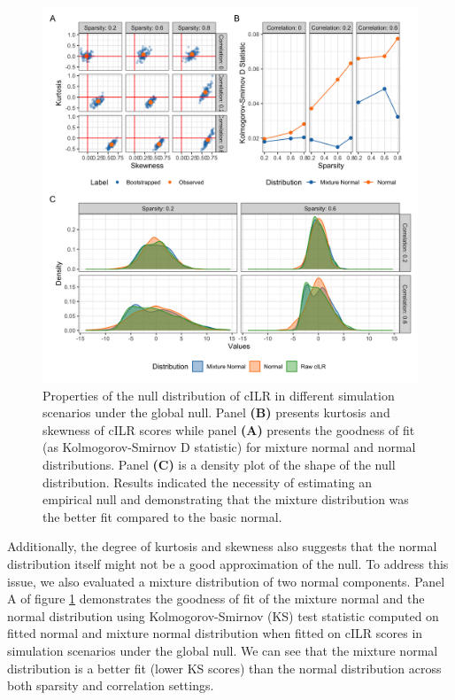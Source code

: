\documentclass{article}
\begin{document}
\begin{figure} [H]
    \centering
    \includegraphics[width=\linewidth]{figures/kurtosis_skewness_gof.png}
    \caption{Properties of the null distribution of cILR in different simulation scenarios under the global null. Panel \textbf{(B)} presents kurtosis and skewness of cILR scores while panel \textbf{(A)} presents the goodness of fit (as Kolmogorov-Smirnov D statistic) for mixture normal and normal distributions. Panel \textbf{(C)} is a density plot of the shape of the null distribution. Results indicated the necessity of estimating an empirical null and demonstrating that the mixture distribution was the better fit compared to the basic normal.}
    \label{fig:kurt_gof}
\end{figure}

Additionally, the degree of kurtosis and skewness also suggests that the normal distribution itself might not be a good approximation of the null. To address this issue, we also evaluated a mixture distribution of two normal components. Panel A of figure \ref{fig:kurt_gof} demonstrates the goodness of fit of the mixture normal and the normal distribution using Kolmogorov-Smirnov (KS) test statistic computed on fitted normal and mixture normal distribution when fitted on cILR scores in simulation scenarios under the global null. We can see that the mixture normal distribution is a better fit (lower KS scores) than the normal distribution across both sparsity and correlation settings. 
\end{document}

